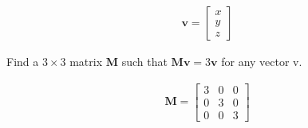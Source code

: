 \begin{align*}
    \boldsymbol{v} = \begin{bmatrix}
    x \\ y \\ z
    \end{bmatrix}
\end{align*}

Find a $3 \times 3$ matrix $\boldsymbol{M}$ such that $\boldsymbol{Mv} = 3\boldsymbol{v}$ for any vector v.

\begin{solution}
\begin{align*}
    \boldsymbol{M} = \begin{bmatrix}
    3 & 0 & 0 \\ 0 & 3 & 0 \\ 0 & 0 & 3
    \end{bmatrix}
\end{align*}
\end{solution}